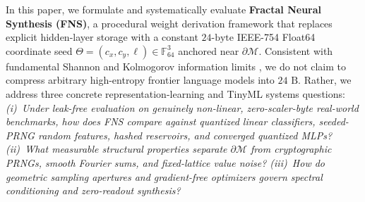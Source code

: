 In this paper, we formulate and systematically evaluate \textbf{Fractal Neural Synthesis (FNS)}, a procedural weight derivation framework that replaces explicit hidden-layer storage with a constant $24\text{-byte}$ IEEE-754 Float64 coordinate seed $\Theta = (c_x, c_y, \ell) \in \mathbb{F}_{64}^3$ anchored near $\partial\mathcal{M}$. Consistent with fundamental Shannon and Kolmogorov information limits \cite{shannon1948mathematical,li2019kolmogorov}, we do not claim to compress arbitrary high-entropy frontier language models into $24\text{ B}$. Rather, we address three concrete representation-learning and TinyML systems questions: \textit{(i)~Under leak-free evaluation on genuinely non-linear, zero-scaler-byte real-world benchmarks, how does FNS compare against quantized linear classifiers, seeded-PRNG random features, hashed reservoirs, and converged quantized MLPs? (ii)~What measurable structural properties separate $\partial\mathcal{M}$ from cryptographic PRNGs, smooth Fourier sums, and fixed-lattice value noise? (iii)~How do geometric sampling apertures and gradient-free optimizers govern spectral conditioning and zero-readout synthesis?}

